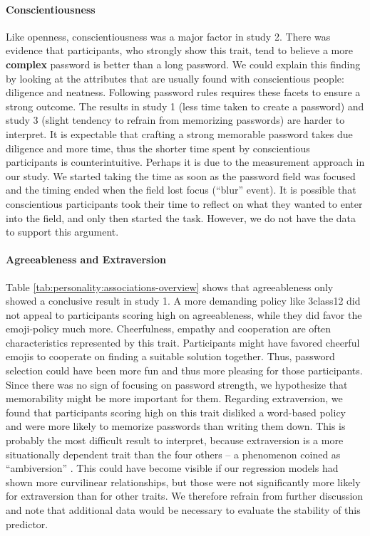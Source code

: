 \paragraph{Conscientiousness} Like openness, conscientiousness was a major factor in study 2. There was evidence that participants, who strongly show this trait, tend to believe a more \textbf{complex} password is better than a long password. We could explain this finding by looking at the attributes that are usually found with conscientious people: diligence and neatness. Following password rules requires these facets to ensure a strong outcome. The results in study 1 (less time taken to create a password) and study 3 (slight tendency to refrain from memorizing passwords) are harder to interpret. It is expectable that crafting a strong memorable password takes due diligence and more time, thus the shorter time spent by conscientious participants is counterintuitive. Perhaps it is due to the measurement approach in our study. We started taking the time as soon as the password field was focused and the timing ended when the field lost focus (``blur'' event). It is possible that conscientious participants took their time to reflect on what they wanted to enter into the field, and only then started the task. However, we do not have the data to support this argument.


\paragraph{Agreeableness and Extraversion} Table \ref{tab:personality:associations-overview} shows that agreeableness only showed a conclusive result in study 1. A more demanding policy like 3class12 did not appeal to participants scoring high on agreeableness, while they did favor the emoji-policy much more. Cheerfulness, empathy and cooperation are often characteristics represented by this trait. 
Participants might have favored cheerful emojis to cooperate on finding a suitable solution together. Thus, password selection could have been more fun and thus more pleasing for those participants. Since there was no sign of focusing on password strength, we hypothesize that memorability might be more important for them. 
Regarding extraversion, we found that participants scoring high on this trait disliked a word-based policy and were more likely to memorize passwords than writing them down. This is probably the most difficult result to interpret, because extraversion is a more situationally dependent trait than the four others -- a phenomenon coined as ``ambiversion'' \cite{Grant2013Ambivert}. This could have become visible if our regression models had shown more curvilinear relationships, but those were not significantly more likely for extraversion than for other traits. We therefore refrain from further discussion and note that additional data would be necessary to evaluate the stability of this predictor. 

